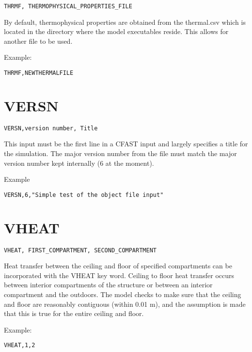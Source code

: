 \begin{lstlisting}
THRMF, THERMOPHYSICAL_PROPERTIES_FILE
\end{lstlisting}

By default, thermophysical properties are obtained from the thermal.csv which is located in the directory where the model executables reside. This allows for another file to be used.

Example:

\begin{lstlisting}
THRMF,NEWTHERMALFILE
\end{lstlisting}

\section{VERSN}

\begin{lstlisting}
VERSN,version number, Title
\end{lstlisting}

This input must be the first line in a CFAST input and largely specifies a title for the simulation. The major version number from the file must match the major version number kept internally (6 at the moment).

Example

\begin{lstlisting}
VERSN,6,"Simple test of the object file input"
\end{lstlisting}

\section{VHEAT}

\begin{lstlisting}
VHEAT, FIRST_COMPARTMENT, SECOND_COMPARTMENT
\end{lstlisting}

Heat transfer between the ceiling and floor of specified compartments can be incorporated with the VHEAT key word. Ceiling to floor heat transfer occurs between interior compartments of the structure or between an interior compartment and the outdoors. The model checks to make sure that the ceiling and floor are reasonably contiguous (within 0.01 m), and the assumption is made that this is true for the entire ceiling and floor.

Example:

\begin{lstlisting}
VHEAT,1,2
\end{lstlisting}

